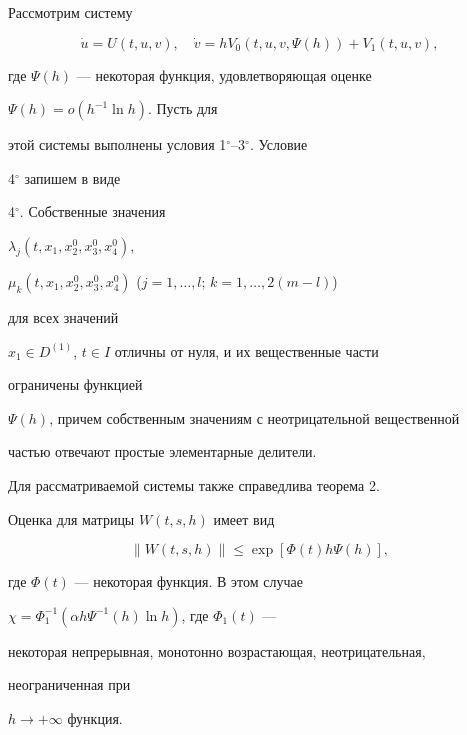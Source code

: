 \begin{note} 


Рассмотрим систему 


$$ 


\Dot u=U(t,u,v),\quad \Dot v=h V_0(t,u,v,\Psi(h))+ 


V_1(t,u,v), 


$$ 


где $\Psi(h)$ --- некоторая функция, удовлетворяющая оценке 


$\Psi(h)=o(h^{-1}\ln h)$. Пусть для 


этой системы выполнены условия 1${}^\circ$--3${}^\circ$. Условие 


4${}^\circ$ запишем в виде 


\medskip 


 


4${}^\circ$. Собственные значения 


$\lambda_j(t,x_1,x^0_2,x^0_3,x^0_4)$, 


$\mu_k(t,x_1,x^0_2,x^0_3,x^0_4)$ ($j=1,\dotsc,l$; $k=1,\dotsc,2(m-l)$) 


для всех значений 


$x_1\in D^{(1)}$, $t\in I$ отличны от нуля, и их вещественные части 


ограничены функцией 


$\Psi(h)$, причем собственным значениям с неотрицательной вещественной 


частью отвечают простые элементарные делители. 


\medskip 


 


Для рассматриваемой системы также справедлива теорема 2. 


 


Оценка для матрицы $W(t,s,h)$ имеет вид 


$$ 


\|W(t,s,h)\|\le\exp[\Phi(t)h\Psi(h)], 


$$ 


где $\Phi(t)$ --- некоторая функция. В этом случае 


$\chi=\Phi^{-1}_1(\alpha h\Psi^{-1}(h)\ln h)$, где $\Phi_1(t)$ --- 


некоторая непрерывная, монотонно возрастающая, неотрицательная, 


неограниченная при 


$h\to+\infty$ функция. 


\end{note} 


